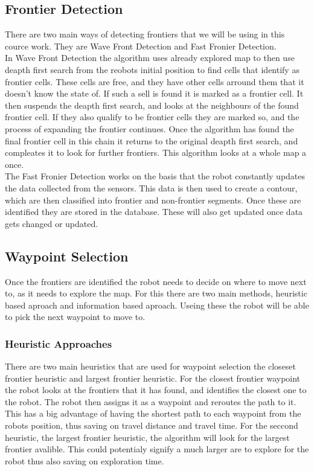 \documentclass[a4paper,12pt]{article}
\begin{document}
			\subsection{Frontier Detection}

				There are two main ways of detecting frontiers that we will be using in this cource work. They are Wave Front Detection and Fast Fronier Detection.
				\\
				In Wave Front Detection the algorithm uses already explored map to then use deapth first search from the reobots initial position to find cells that identify as frontier cells. These cells are free, and they have other cells arround them that it doesn't know the state of. If such a sell is found it is marked as a frontier cell. It then suspends the deapth first search, and looks at the neighbours of the found frontier cell. If they also qualify to be frontier cells they are marked so, and the process of expanding the frontier continues. Once the algorithm has found the final frontier cell in this chain it returns to the original deapth first search, and compleates it to look for further frontiers. This algorithm looks at a whole map a once.
				\\
				The Fast Fronier Detection works on the basis that the robot constantly updates the data collected from the sensors. This data is then used to create a contour, which are then classified into frontier and non-frontier segments. Once these are identified they are stored in the database. These will also get updated once data gets changed or updated.
				
			\subsection{Waypoint Selection}

				Once the frontiers are identified the robot needs to decide on where to move next to, as it needs to explore the map. For this there are two main methods, heuristic based aproach and information based aproach. Useing these the robot will be able to pick the next waypoint to move to.

				\subsubsection{Heuristic Approaches}
					There are two main heuristics that are used for waypoint selection the closeset frontier heuristic and largest frontier heuristic. For the closest frontier waypoint the robot looks at the frontiers that it has found, and identifies the closest one to the robot. The robot then assigns it as a waypoint and reroutes the path to it. This has a big advantage of having the shortest path to each waypoint from the robots position, thus saving on travel distance and travel time. For the seccond heuristic, the largest frontier heuristic, the  algorithm will look for the largest frontier avalible. This could potentialy signify a much larger are to explore for the robot thus also saving on exploration time.
\end{document}
